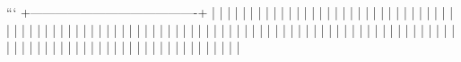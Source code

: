 ```
+----------------------------------------+
|                                       |
|                                       |
|                                       |
|                                       |
|                                       |
|                                       |
|                                       |
|                                       |
|                                       |
|                                       |
|                                       |
|                                       |
|                                       |
|                                       |
|                                       |
|                                       |
|                                       |
|                                       |
|                                       |
|                                       |
|                                       |
|                                       |
|                                       |
|                                       |
|                                       |
|                                       |
|                                       |
|                                       |
|                                       |
|                                       |
|                                       |
|                                       |
|                                       |
|                                       |
|                                       |
|                                       |
|                                       |
|                                       |
|                                       |
|                                       |
|                                       |
|                                       |
|                                       |
|                                       |
|                                       |
|                                       |
|                                       |
|                                       |
|                                       |
|                                       |
|                                       |
|                                       |
|                                       |
|                                       |
|                                       |
|                                       |
|                                       |
|                                       |
|                                       |
|                                       |
|                                       |
